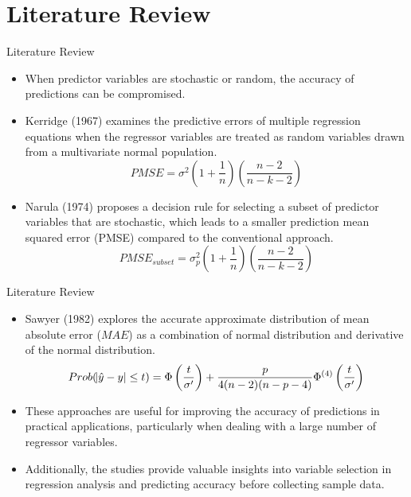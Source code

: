 \documentclass{beamer}
\begin{document}
\section{Literature Review}
\label{sec:litreview}

\begin{frame}{Literature Review}
\begin{itemize}

\item When predictor variables are stochastic or random, the accuracy of predictions can be compromised.
\item Kerridge (1967) examines the predictive errors of multiple regression equations when the regressor variables are treated as random variables drawn from a multivariate normal population.
\begin{equation}\label{eq:kerridge}
PMSE = \sigma^2\left(1+\frac{1}{n}\right)\left(\frac{n-2}{n-k-2}\right)
\end{equation}
\item Narula (1974) proposes a decision rule for selecting a subset of predictor variables that are stochastic, which leads to a smaller prediction mean squared error (PMSE) compared to the conventional approach.
\begin{equation}\label{eq:narula}
PMSE_{subset} = \sigma_p^2\left(1+\frac{1}{n}\right)\left(\frac{n-2}{n-k-2}\right)
\end{equation}
\end{itemize}
\end{frame}





\begin{frame}{Literature Review}
\begin{itemize}
\item Sawyer (1982) explores the accurate approximate distribution of mean absolute error ($MAE$) as a combination of normal distribution and derivative of the normal distribution.
\begin{equation}\label{eq:sawyer}
Prob(\abs{\hat{y} - y} \leq t) = \Phi\left(\frac{t}{\sigma'}\right) + \frac{p}{4(n-2)(n-p-4)}\Phi^{(4)}\left(\frac{t}{\sigma'}\right)
\end{equation}
\item These approaches are useful for improving the accuracy of predictions in practical applications, particularly when dealing with a large number of regressor variables.
\item Additionally, the studies provide valuable insights into variable selection in regression analysis and predicting accuracy before collecting sample data.
\end{itemize}
\end{frame}
\end{document}
